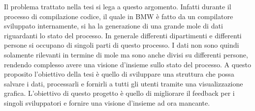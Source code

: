 \documentclass[../main.tex]{subfiles}
\begin{document}
Il problema trattato nella tesi si lega a questo argomento. Infatti durante il processo di compilazione codice, il quale in \gls{BMW} è fatto da un compilatore sviluppato internamente, si ha la generazione di una grande mole di dati riguardanti lo stato del processo. In generale differenti dipartimenti e differenti persone si occupano di singoli parti di questo processo. I dati non sono quindi solamente rilevanti in termine di mole ma sono anche divisi su differenti persone, rendendo complesso avere una visione d'insieme sullo stato del processo. A questo proposito l'obiettivo della tesi è quello di sviluppare una struttura che possa salvare i dati, processarli e fornirli a tutti gli utenti tramite una visualizzazione grafica. L'obiettivo di questo progetto è quello di migliorare il feedback per i singoli sviluppatori e fornire una visione d'insieme ad ora mancante. 
\end{document}
